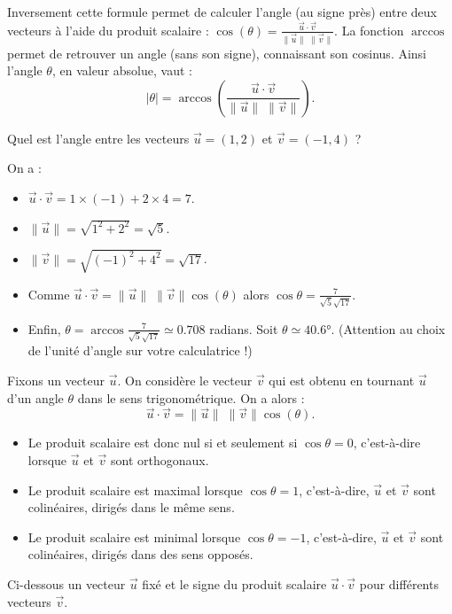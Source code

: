 \documentclass[11pt,class=report,crop=false]{standalone}
\begin{document}


Inversement cette formule permet de calculer l'angle (au signe près) entre deux vecteurs à l'aide du produit scalaire :
$\cos(\theta) = \frac{\vec u \cdot \vec v}{\|\vec u\| \; \|\vec v\|}$.
La fonction $\arccos$ permet de retrouver un angle (sans son signe), connaissant son cosinus. Ainsi l'angle $\theta$, en valeur absolue, vaut :
$$
    |\theta| = \arccos \left( \frac{\vec u \cdot \vec v}{\|\vec u\| \; \|\vec v\|} \right).
$$

\begin{exemple}
Quel est l'angle entre les vecteurs $\vec u = (1,2)$ et $\vec v = (-1,4)$ ?



On a :
\begin{itemize}
    \item $\vec u \cdot \vec v = 1 \times (-1) + 2 \times 4 = 7$.
    \item $\| \vec u \| = \sqrt{1^2 + 2^2} = \sqrt{5}$.
    \item $\| \vec v \| = \sqrt{(-1)^2 + 4^2} = \sqrt{17}$.
    \item Comme $\vec u \cdot \vec v = \|\vec u\| \; \|\vec v\| \cos(\theta)$
alors $\cos \theta = \frac{7}{\sqrt{5} \sqrt{17}}$.
    

    \item Enfin, $\theta = \arccos \frac{7}{\sqrt{5} \sqrt{17}} \simeq 0.708$ radians. Soit $\theta \simeq \ang{40.6}$. (Attention au choix de l'unité d'angle sur votre calculatrice !)
\end{itemize}

\end{exemple}

\begin{exemple}
Fixons un vecteur $\vec u$.
On considère le vecteur $\vec v$ qui est obtenu en tournant $\vec u$ d'un angle $\theta$ dans le sens trigonométrique.
On a alors :
$$
    \vec u \cdot \vec v = \|\vec u\| \; \|\vec v\| \cos(\theta).
$$

\begin{itemize}
    \item Le produit scalaire est donc nul si et seulement si $\cos \theta = 0$, c'est-à-dire lorsque $\vec u$ et $\vec v$ sont orthogonaux.
    \item Le produit scalaire est maximal lorsque $\cos\theta = 1$, c'est-à-dire, $\vec u$ et $\vec v$ sont colinéaires, dirigés dans le même sens.
    \item Le produit scalaire est minimal lorsque $\cos\theta = -1$, c'est-à-dire, $\vec u$ et $\vec v$ sont colinéaires, dirigés dans des sens opposés.
\end{itemize}

Ci-dessous un vecteur $\vec u$ fixé et le signe du produit scalaire $\vec u \cdot \vec v$ pour différents vecteurs $\vec v$.

\end{exemple}
\end{document}
